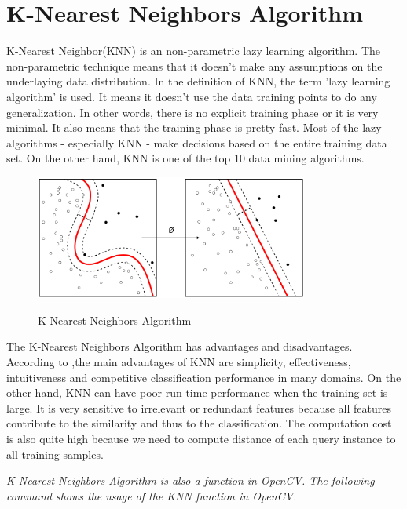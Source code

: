 %
\section{K-Nearest Neighbors Algorithm}\label{sec:K-Nearest Neighbors Algorithm}
%
K-Nearest Neighbor(KNN) is an non-parametric lazy learning algorithm. The non-parametric technique means that it doesn't make any assumptions on the underlaying data distribution. In the definition of KNN, the term 'lazy learning algorithm' is used. It means it doesn't use the data training points to do any generalization. In other words, there is no explicit training phase or it is very minimal.  It also means that the training phase is pretty fast. Most of the lazy algorithms - especially KNN - make decisions based on the entire training data set. On the other hand, KNN is one of the top 10 data mining algorithms\cite{k_nearest_neighbors}.

\begin{figure}[H]
 \centering
  \includegraphics[width=0.8\textwidth]{./Bilder/k-nearest-neighbors.png}\label{Procedures_of_IPM}
  \caption{K-Nearest-Neighbors Algorithm\cite{k_nearest_neighbors_wikipedia}}
\end{figure}

The K-Nearest Neighbors Algorithm has advantages and disadvantages. According to \cite{k_nearest_neighbors_adv_disadv},the main advantages of KNN are simplicity, effectiveness, intuitiveness and competitive classification performance in many domains. On the other hand, KNN can have poor run-time performance when the training set is large. It is very sensitive to irrelevant or redundant features because all features contribute to the similarity and thus to the classification. The computation cost is also quite high because we need to compute distance of each query instance to all training samples. 

\emph{\color{blue}K-Nearest Neighbors Algorithm is also a function in OpenCV. The following command shows the usage of the KNN function in OpenCV.}

